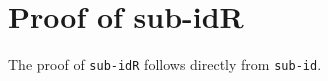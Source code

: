 \hypertarget{proof-of-sub-idr}{%
\section{Proof of sub-idR}\label{proof-of-sub-idr}}

The proof of \texttt{sub-idR} follows directly from \texttt{sub-id}.

\begin{fence}
\begin{code}%
\>[0]\AgdaSpace{}%
\AgdaSymbol{:}\AgdaSpace{}%
\AgdaSpace{}%
\AgdaSymbol{\}}\AgdaSpace{}%
\AgdaSymbol{\{}\AgdaSpace{}%
\AgdaSymbol{:}\AgdaSpace{}%
\AgdaSpace{}%
\AgdaSpace{}%
\AgdaSymbol{\}}\AgdaSpace{}%
\AgdaSymbol{\{}\AgdaSymbol{\}}\<%
\\
\>[0][@{}l@{\AgdaIndent{0}}]%
\>[7]\AgdaSpace{}%
\AgdaSymbol{(}\AgdaSpace{}%
\AgdaSpace{}%
\AgdaSymbol{)}\AgdaSpace{}%
\AgdaSpace{}%
\AgdaSpace{}%
\AgdaSymbol{\{}\AgdaSymbol{\}}\<%
\\
\>[0]%
\>[1618I]\AgdaSymbol{\{}\AgdaSymbol{\}\{}\AgdaSpace{}%
\AgdaSymbol{=}\AgdaSpace{}%
\AgdaSymbol{\}\{}\AgdaSymbol{\}}\AgdaSpace{}%
\AgdaSymbol{=}\<%
\\
\>[1618I][@{}l@{\AgdaIndent{0}}]%
\>[10]\<%
\\
\>[10][@{}l@{\AgdaIndent{0}}]%
\>[12]\AgdaSpace{}%
\AgdaSpace{}%
\<%
\\
%
\>[10]\<%
\\
\>[10][@{}l@{\AgdaIndent{0}}]%
\>[12]\AgdaSpace{}%
\AgdaSpace{}%
\AgdaSpace{}%
\AgdaSpace{}%
\<%
\\
%
\>[10]\AgdaSpace{}%
\AgdaSpace{}%
\AgdaSpace{}%
\AgdaSpace{}%
\AgdaSpace{}%
\AgdaSymbol{)}\AgdaSpace{}%
\<%
\\
\>[10][@{}l@{\AgdaIndent{0}}]%
\>[12]\<%
\\
%
\>[10]\<%
\end{code}
\end{fence}

